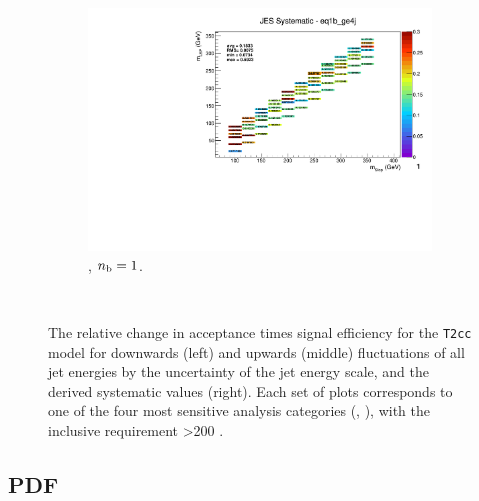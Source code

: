 \begin{figure}[ht!]
\begin{subfigure}[b]{0.32\textwidth}
    \includegraphics[width=\textwidth, page=1]{Figs/sms/t2cc/v37_2/systs/T2cc_JES_eq1b_ge4j.pdf}
    \caption{\njhigh, $n_{\text{b}} = 1$.}
    \label{fig:sms-jes-t2cc-ge4j-1b}
  \end{subfigure}\\
  \caption{The relative change in acceptance times signal efficiency for the
  \texttt{T2cc} model for downwards (left) and upwards (middle) fluctuations
  of all jet energies by the uncertainty of the jet energy scale, and the 
  derived systematic values (right). Each set of plots corresponds to one of
  the four most sensitive analysis categories (\nb, \nj), with the inclusive 
  requirement \HT>200 \gev.}
  \label{fig:sms-jes-t2cc}
\end{figure}


\newpage
\subsection*{PDF}
\label{sec:t2cc_pdf_plots}

